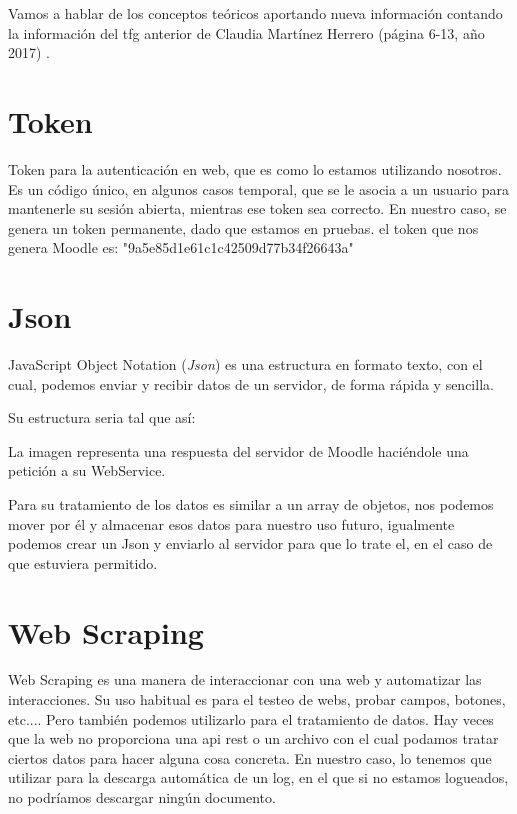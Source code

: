 
Vamos a hablar de los conceptos teóricos aportando nueva información contando la información del tfg anterior de Claudia Martínez Herrero (página 6-13, año 2017) \cite{claudia}.




\section{Token}\label{token}

Token para la autenticación en web, que es como lo estamos utilizando nosotros. Es un código único, en algunos casos temporal, que se le asocia a un usuario para mantenerle su sesión abierta, mientras ese token sea correcto. En nuestro caso, se genera un token permanente, dado que estamos en pruebas. el token que nos genera Moodle es: "9a5e85d1e61c1c42509d77b34f26643a"

\section{Json}\label{json}

JavaScript Object Notation (\emph{Json}) es una estructura en formato texto, con el cual, podemos enviar y recibir datos de un servidor, de forma rápida y sencilla. 

Su estructura seria tal que así:


La imagen representa una respuesta del servidor de Moodle haciéndole una petición a su WebService.

Para su tratamiento de los datos es similar a un array de objetos, nos podemos mover por él y almacenar esos datos para nuestro uso futuro, igualmente podemos crear un Json y enviarlo al servidor para que lo trate el, en el caso de que estuviera permitido.

\section{Web Scraping}\label{web-scraping}

Web Scraping es una manera de interaccionar con una web y automatizar las interacciones. Su uso habitual es para  el testeo de webs, probar campos, botones, etc.... Pero también podemos utilizarlo para el tratamiento de datos. Hay veces que la web no proporciona una api rest o un archivo con el cual podamos tratar ciertos datos para hacer alguna cosa concreta. En nuestro caso, lo tenemos que utilizar para la descarga automática de un log, en el que si no estamos logueados, no podríamos descargar ningún documento.

